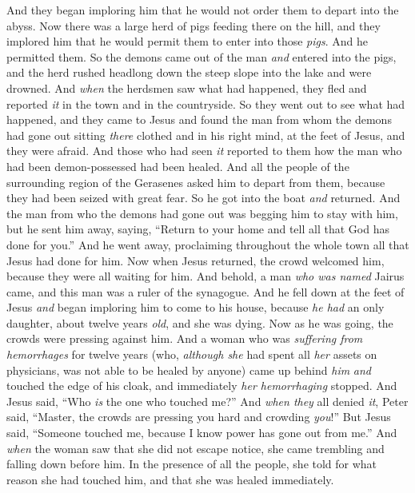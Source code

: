 \begin{biblechapter}
\verse And they began imploring him that he would not order them to depart into the abyss.
\verse Now there was a large herd of pigs feeding there on the hill, and they implored him that he would permit them to enter into those \textit{pigs}. And he permitted them.
\verse So the demons came out of the man \textit{and} entered into the pigs, and the herd rushed headlong down the steep slope into the lake and were drowned.
\verse And \textit{when} the herdsmen saw what had happened, they fled and reported \textit{it} in the town and in the countryside.
\verse So they went out to see what had happened, and they came to Jesus and found the man from whom the demons had gone out sitting \textit{there} clothed and in his right mind, at the feet of Jesus, and they were afraid.
\verse And those who had seen \textit{it} reported to them how the man who had been demon-possessed had been healed.
\verse And all the people of the surrounding region of the Gerasenes asked him to depart from them, because they had been seized with great fear. So he got into the boat \textit{and} returned.
\verse And the man from who the demons had gone out was begging him to stay with him, but he sent him away, saying,
\verse “Return to your home and tell all that God has done for you.” And he went away, proclaiming throughout the whole town all that Jesus had done for him.
 Now when Jesus returned, the crowd welcomed him, because they were all waiting for him.
\verse And behold, a man \textit{who was named} Jairus came, and this man was a ruler of the synagogue. And he fell down at the feet of Jesus \textit{and} began imploring him to come to his house,
\verse because \textit{he had} an only daughter, about twelve years \textit{old}, and she was dying.
\verse Now as he was going, the crowds were pressing against him.
\verse And a woman who was \textit{suffering from hemorrhages} for twelve years (who, \textit{although she} had spent all \textit{her} assets on physicians, was not able to be healed by anyone)
\verse came up behind \textit{him} \textit{and} touched the edge of his cloak, and immediately \textit{her hemorrhaging} stopped.
\verse And Jesus said, “Who \textit{is} the one who touched me?” And \textit{when they} all denied \textit{it}, Peter said, “Master, the crowds are pressing you hard and crowding \textit{you}!”
\verse But Jesus said, “Someone touched me, because I know power has gone out from me.”
\verse And \textit{when} the woman saw that she did not escape notice, she came trembling and falling down before him. In the presence of all the people, she told for what reason she had touched him, and that she was healed immediately.

\end{biblechapter}
